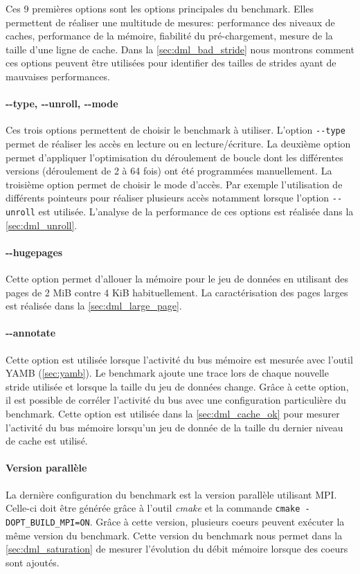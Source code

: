         Ces 9 premières options sont les options principales du benchmark. Elles permettent de réaliser une multitude de mesures: performance des niveaux de caches, performance de la mémoire, fiabilité du pré-chargement, mesure de la taille d'une ligne de cache. Dans la \autoref{sec:dml_bad_stride} nous montrons comment ces options peuvent être utilisées pour identifier des tailles de strides ayant de mauvaises performances.
    
    
        \paragraph{-{}-type, -{}-unroll, -{}-mode} Ces trois options permettent de choisir le benchmark à utiliser. L'option \verb|--type| permet de réaliser les accès en lecture ou en lecture/écriture. La deuxième option permet d'appliquer l'optimisation du déroulement de boucle dont les différentes versions (déroulement de 2 à 64 fois) ont été programmées manuellement. La troisième option permet de choisir le mode d'accès. Par exemple l'utilisation de différents pointeurs pour réaliser plusieurs accès notamment lorsque l'option \verb|--unroll| est utilisée. L'analyse de la performance de ces options est réalisée dans la \autoref{sec:dml_unroll}.

        \paragraph{-{}-hugepages} Cette option permet d'allouer la mémoire pour le jeu de données en utilisant des pages de 2 MiB contre 4 KiB habituellement. La caractérisation des pages larges est réalisée dans la \autoref{sec:dml_large_page}.
        
        \paragraph{-{}-annotate} Cette option est utilisée lorsque l'activité du bus mémoire est mesurée avec l'outil YAMB (\autoref{sec:yamb}). Le benchmark ajoute une trace lors de chaque nouvelle stride utilisée et lorsque la taille du jeu de données change. Grâce à cette option, il est possible de corréler l'activité du bus avec une configuration particulière du benchmark. Cette option est utilisée dans la \autoref{sec:dml_cache_ok} pour mesurer l'activité du bus mémoire lorsqu'un jeu de donnée de la taille du dernier niveau de cache est utilisé. 

        \paragraph{Version parallèle} La dernière configuration du benchmark est la version parallèle utilisant MPI. Celle-ci doit être générée grâce à l'outil \textit{cmake} et la commande \verb|cmake -DOPT_BUILD_MPI=ON|. Grâce à cette version, plusieurs coeurs peuvent exécuter la même version du benchmark. Cette version du benchmark nous permet dans la \autoref{sec:dml_saturation} de mesurer l'évolution du débit mémoire lorsque des coeurs sont ajoutés.
        
